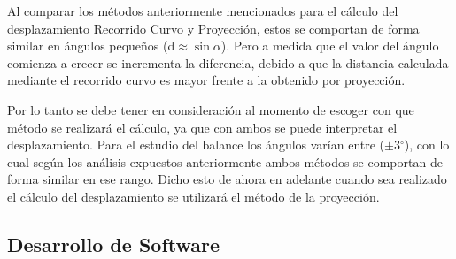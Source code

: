 \documentclass[12pt,a4paper]{article}
\newcommand{\grad}{$^{\circ}$}
\begin{document}
Al comparar los métodos anteriormente mencionados para el cálculo del desplazamiento Recorrido Curvo y Proyección, estos se comportan de forma similar en ángulos pequeños (d$\approx\sin\alpha$). Pero a medida que el valor del ángulo comienza a crecer se incrementa la diferencia, debido a que la distancia calculada mediante el recorrido curvo es mayor frente a la obtenido por proyección.

Por lo tanto se debe tener en consideración al momento de escoger con que método se realizará el cálculo, ya que con ambos se puede interpretar el desplazamiento. Para el estudio del balance los ángulos varían entre ($\pm 3$\grad), con lo cual según los análisis expuestos anteriormente ambos métodos se comportan de forma similar en ese rango.
Dicho esto de ahora en adelante cuando sea realizado el cálculo del desplazamiento se utilizará el método de la proyección.


\newpage
\subsection{Desarrollo de Software}
\end{document}
